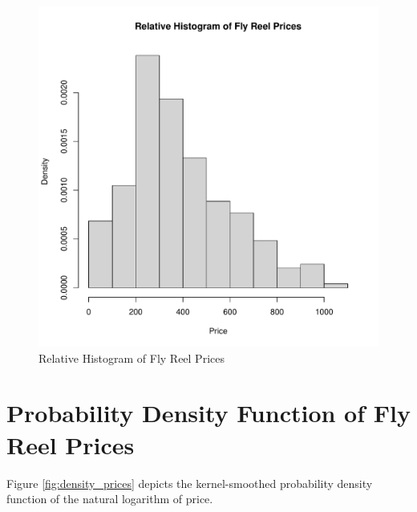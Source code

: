 \documentclass[11pt]{book}
\begin{document}
\begin{figure}[h!]
  \centering
  \includegraphics[scale = 0.5, keepaspectratio=true]{../Figures/hist_prices}
  \caption{Relative Histogram of Fly Reel Prices} \label{fig:hist_prices}
\end{figure}


\pagebreak
\section*{Probability Density Function of Fly Reel Prices}

Figure \ref{fig:density_prices} depicts 
the kernel-smoothed probability density function of the natural logarithm of
price.
\end{document}
